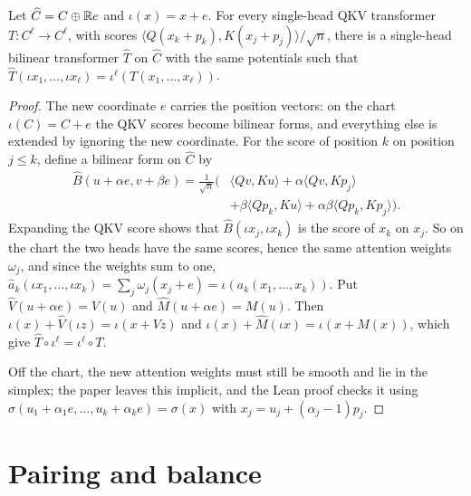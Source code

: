 \begin{proposition}
\label{prop:homogenization}
\leanok
{}
Let $\widehat C=C\oplus\mathbb{R} e$ and $\iota(x)=x+e$. For every single-head QKV
transformer $T\colon C^\ell\to C^\ell$, with scores
$\langle Q(x_k+p_k),K(x_j+p_j)\rangle/\sqrt n$, there is a single-head
bilinear transformer $\widehat T$ on $\widehat C$ with the same potentials
such that $\widehat T(\iota x_1,\ldots,\iota x_\ell)=\iota^\ell(T(x_1,\ldots,x_\ell))$.
\end{proposition}
\begin{proof}
\leanok
{}
The new coordinate $e$ carries the position vectors: on the chart
$\iota(C)=C+e$ the QKV scores become bilinear forms, and everything else is
extended by ignoring the new coordinate. For the score of position $k$ on
position $j\le k$, define a bilinear form on $\widehat C$ by
\[
 \begin{aligned}
 \widehat B(u+\alpha e,v+\beta e)=\tfrac1{\sqrt n}\bigl(&\langle Qv,Ku\rangle
 +\alpha\langle Qv,Kp_j\rangle\\
 &+\beta\langle Qp_k,Ku\rangle+\alpha\beta\langle Qp_k,Kp_j\rangle\bigr).
 \end{aligned}
\]
Expanding the QKV score shows that $\widehat B(\iota x_j,\iota x_k)$ is the
score of $x_k$ on $x_j$. So on the chart the two heads have the same
scores, hence the same attention weights $\omega_j$, and since the weights
sum to one,
$\widehat a_k(\iota x_1,\ldots,\iota x_k)=\sum_j\omega_j(x_j+e)=\iota(a_k(x_1,\ldots,x_k))$.
Put $\widehat V(u+\alpha e)=V(u)$ and $\widehat M(u+\alpha e)=M(u)$. Then
$\iota(x)+\widehat V(\iota z)=\iota(x+Vz)$ and
$\iota(x)+\widehat M(\iota x)=\iota(x+M(x))$, which give
$\widehat T\circ\iota^\ell=\iota^\ell\circ T$.

Off the chart, the new attention weights must still be smooth and lie in
the simplex; the paper leaves this implicit, and the Lean proof checks it
using
$\widehat\sigma(u_1+\alpha_1e,\ldots,u_k+\alpha_ke)=\sigma(x)$ with
$x_j=u_j+(\alpha_j-1)p_j$.
\end{proof}

\chapter{Pairing and balance}

